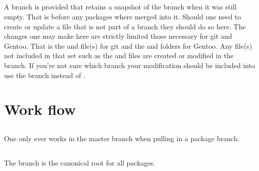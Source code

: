 \documentclass{article}
\begin{document}
\subsection{}

A  branch is provided that retains a snapshot of the  branch when it was still empty.
That is before any packages where merged into it.
Should one need to create or update a file that is not part of a  branch they should do so here.
The changes one may make here are strictly limited those necessary for git and Gentoo. 
That is the  and  file(s) for git and the  and  folders for Gentoo.
Any file(s) not included in that set such as the  and  files are created or modified in the  branch.
If you're not sure which branch your modification should be included into use the  branch instead of .


\section{Work flow}

\subsection{}

One only ever works in the master branch when pulling in a package branch.

\subsection{}

The  branch is the canonical root for all packages. 
\end{document}
